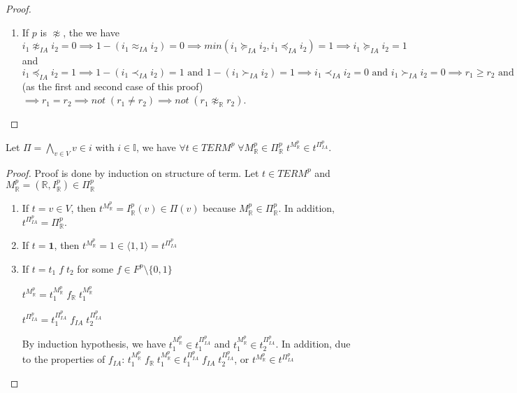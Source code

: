 \begin{proof}
\begin{enumerate}
\item \sloppy If $p$ is $\not\approx$, the we have $i_1 \not\approx_{IA} i_2 = 0  \implies 1 - (i_1 \approx_{IA} i_2) = 0  \implies {min(i_1 \succeq_{IA} i_2, i_1 \preceq_{IA} i_2) = 1} \implies i_1 \succeq_{IA} i_2 = 1$ and $i_1 \preceq_{IA} i_2 = 1   \implies 1 - (i_1 \prec_{IA} i_2) = 1 \text{ and } 1 - (i_1 \succ_{IA} i_2) = 1  \implies {i_1 \prec_{IA} i_2 = 0  \text{ and } i_1 \succ_{IA} i_2 = 0}  \implies {r_1 \ge r_2} \text{ and } {r_1 \le r_2}$ (as the first and second case of this proof) $\implies r_1 = r_2 \implies not \; (r_1 \not= r_2) \implies not \; (r_1 \not\approx_\mathbb{R} r_2)$.
\end{enumerate}
\end{proof}

\begin{lemma} \label{lemma:IA-OT}
Let $\Pi = \bigwedge\limits_{v \in V}v \in i$ with $i \in \mathbb{I}$, we have ${\forall t \in TERM^p \; \forall M^p_\mathbb{R} \in \Pi^p_\mathbb{R} \; t^{M^p_\mathbb{R}} \in t^{\Pi^p_{IA}}}$.
\end{lemma}

\begin{proof}
Proof is done by induction on structure of term.
Let $t \in TERM^p$ and $M^p_\mathbb{R} = (\mathbb{R}, I^p_\mathbb{R}) \in \Pi^p_\mathbb{R}$
\begin{enumerate}
\item If $t = v \in V$, then $t^{M^p_\mathbb{R}} = I^p_\mathbb{R}(v) \in \Pi(v)$ because $M^p_\mathbb{R} \in \Pi^p_\mathbb{R}$. In addition, $t^{\Pi^p_{IA}} = \Pi^p_\mathbb{R}$.
\item If $t = \mathbf{1}$, then $t^{M^p_\mathbb{R}} = 1 \in \langle 1, 1\rangle  = t^{\Pi^p_{IA}}$
\item If $t = t_1 \; f \; t_2$ for some $f \in F^p \setminus \{0, 1\}$

$t^{M^p_\mathbb{R}} = t_1^{M^p_\mathbb{R}} \; f_\mathbb{R} \; t_1^{M^p_\mathbb{R}}$

$t^{\Pi^p_{IA}} = t_1^{\Pi^p_{IA}} \; f_{IA} \; t_2^{\Pi^p_{IA}}$

By induction hypothesis, we have $t_1^{M^p_\mathbb{R}} \in t_1^{\Pi^p_{IA}}$ and $t_1^{M^p_\mathbb{R}} \in t_2^{\Pi^p_{IA}}$. In addition, due to the properties of $f_{IA}$: $t_1^{M^p_\mathbb{R}} \; f_\mathbb{R} \; t_1^{M^p_\mathbb{R}} \in t_1^{\Pi^p_{IA}} \; f_{IA} \; t_2^{\Pi^p_{IA}}$, or $t^{M^p_\mathbb{R}} \in t^{\Pi^p_{IA}}$ 
\end{enumerate}
\end{proof}

